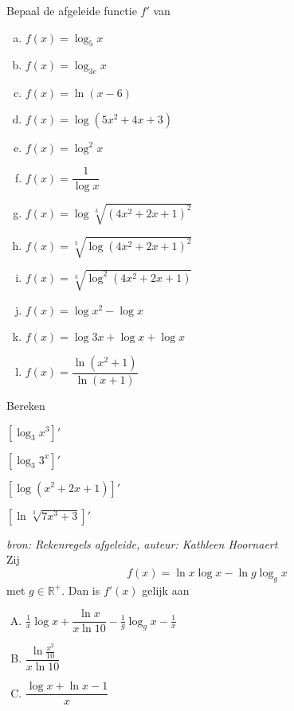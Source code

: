 \documentclass[12pt,twoside,a4paper]{article}
\begin{document}
\begin{oefening}
Bepaal de afgeleide functie $f'$ van
\begin{multicols}{2}
\begin{enumerate}[(a)]
  \itemsep0.5em
  \item $\displaystyle f(x)=\log_5 x$
  \item $\displaystyle f(x)=\log_{3e} x$
  \item $\displaystyle f(x)=\ln(x-6)$
  \item $\displaystyle f(x)=\log(5x^2+4x+3)$
  \item $\displaystyle f(x)=\log^2 x$
  \item $\displaystyle f(x)=\dfrac{1}{\log x}$
  \item $\displaystyle f(x)=\log \sqrt[3]{\left(4x^2+2x+1\right)^2}$
  \item $\displaystyle f(x)=\sqrt[3]{\log\left(4x^2+2x+1\right)^2}$
  \item $\displaystyle f(x)=\sqrt[3]{\log^2(4x^2+2x+1)}$
  \item $\displaystyle f(x)=\log x^2 - \log x$
  \item $\displaystyle f(x)=\log 3x + \log x + \log x$
  \item $\displaystyle f(x)=\dfrac{\ln(x^2+1)}{\ln(x+1)}$
\end{enumerate}
\end{multicols}
\end{oefening}

\begin{oefening}
Bereken
\begin{exlist}{2}
  \item $\displaystyle \left[\log_3 x^3\right]'$
  \item $\displaystyle \left[\log_3 3^x\right]'$
  \item $\displaystyle \left[\log \left(x^2+2x+1\right)\right]'$
  \item $\displaystyle \left[\ln \sqrt[3]{7x^3+3}\right]'$
\end{exlist}
\end{oefening}

\begin{oefening}
{\em \scriptsize bron: Rekenregels afgeleide, auteur: Kathleen Hoornaert}\\
Zij
$$f(x)=\ln x \log x - \ln g \log_g x$$
met $g\in \mathbb{R}^+$. Dan is $f'(x)$ gelijk aan
\begin{enumerate}[(A)]
  \itemsep.8em
  \item $\frac{1}{x} \log x + \dfrac{\ln x}{x \ln 10} - \frac{1}{g}\log_g x - \frac{1}{x}$
  \item $\dfrac{\ln \frac{x^2}{10}}{x \ln 10}$
  \item $\dfrac{\log x + \ln x - 1}{x}$
\end{enumerate}
\end{oefening}
\end{document}
